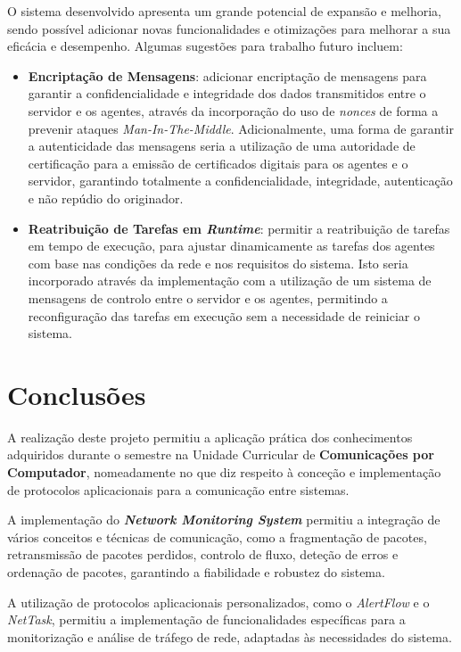 \documentclass[a4paper,12pt]{scrreprt}
\begin{document}
O sistema desenvolvido apresenta um grande potencial de expansão e melhoria, sendo
possível adicionar novas funcionalidades e otimizações para melhorar a sua eficácia
e desempenho. Algumas sugestões para trabalho futuro incluem:

\begin{itemize}
    \item \textbf{Encriptação de Mensagens}: adicionar encriptação de
    mensagens para garantir a confidencialidade e integridade dos dados transmitidos entre
    o servidor e os agentes, através da incorporação do uso de \textit{nonces}
    de forma a prevenir ataques \textit{Man-In-The-Middle}. Adicionalmente, uma forma de 
    garantir a autenticidade das mensagens seria a utilização de uma autoridade de certificação
    para a emissão de certificados digitais para os agentes e o servidor, garantindo totalmente
    a confidencialidade, integridade, autenticação e não repúdio do originador.

    \item \textbf{Reatribuição de Tarefas em \textit{Runtime}}: permitir a reatribuição
    de tarefas em tempo de execução, para ajustar dinamicamente as tarefas dos agentes
    com base nas condições da rede e nos requisitos do sistema. Isto seria incorporado
    através da implementação com a utilização de um sistema de mensagens de controlo
    entre o servidor e os agentes, permitindo a reconfiguração das tarefas em execução
    sem a necessidade de reiniciar o sistema.
\end{itemize}

\section{Conclusões}

A realização deste projeto permitiu a aplicação prática dos conhecimentos adquiridos
durante o semestre na Unidade Curricular de \textbf{Comunicações por Computador},
nomeadamente no que diz respeito à conceção e implementação de protocolos aplicacionais
para a comunicação entre sistemas. 

A implementação do \textbf{\textit{Network Monitoring System}} permitiu a integração de
vários conceitos e técnicas de comunicação, como a fragmentação de pacotes, retransmissão
de pacotes perdidos, controlo de fluxo, deteção de erros e ordenação de pacotes, garantindo
a fiabilidade e robustez do sistema.

A utilização de protocolos aplicacionais personalizados, como o \textit{AlertFlow} e o
\textit{NetTask}, permitiu a implementação de funcionalidades específicas para a
monitorização e análise de tráfego de rede, adaptadas às necessidades do sistema.
\end{document}
